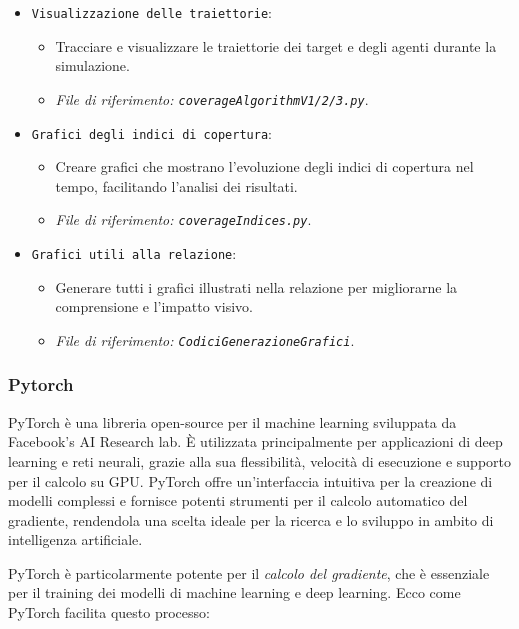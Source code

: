 \documentclass[twoside]{article}
\begin{document}
\begin{itemize}
    \item \verb|Visualizzazione delle traiettorie|: 
    \begin{itemize}
        \item Tracciare e visualizzare le traiettorie dei target e degli agenti durante la simulazione.
        \item \textit{File di riferimento: \texttt{coverageAlgorithmV1/2/3.py}}.
    \end{itemize}

    \item \verb|Grafici degli indici di copertura|:
    \begin{itemize}
        \item Creare grafici che mostrano l'evoluzione degli indici di copertura nel tempo, facilitando l'analisi dei risultati.
        \item \textit{File di riferimento: \texttt{coverageIndices.py}}.
    \end{itemize}

    \item \verb|Grafici utili alla relazione|:
    \begin{itemize}
        \item Generare tutti i grafici illustrati nella relazione per migliorarne la comprensione e l'impatto visivo.
        \item \textit{File di riferimento: \texttt{CodiciGenerazioneGrafici}}.
    \end{itemize}
\end{itemize}


\subsubsection{Pytorch}\label{section: pytorch}

PyTorch è una libreria open-source per il machine learning sviluppata da Facebook's AI Research lab. È utilizzata principalmente per applicazioni di deep learning e reti neurali, grazie alla sua flessibilità, velocità di esecuzione e supporto per il calcolo su GPU. PyTorch offre un'interfaccia intuitiva per la creazione di modelli complessi e fornisce potenti strumenti per il calcolo automatico del gradiente, rendendola una scelta ideale per la ricerca e lo sviluppo in ambito di intelligenza artificiale.

\vspace{\baselineskip}

PyTorch è particolarmente potente per il \textit{calcolo del gradiente}, che è essenziale per il training dei modelli di machine learning e deep learning. Ecco come PyTorch facilita questo processo:
\end{document}
